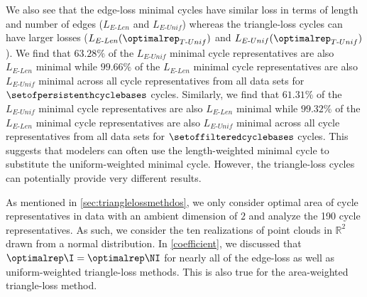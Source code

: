 We also see that the edge-loss minimal cycles have similar loss in terms of length and number of edges ($L_{E\text{-}Len}$ and $L_{E\text{-}Unif}$) whereas the triangle-loss cycles can have larger losses ($L_{E\text{-}Len}(\optimalrep_{T\text{-}Unif})$ and $L_{E\text{-}Unif}(\optimalrep_{T\text{-}Unif})$). We find that $63.28\%$ of the $L_{E\text{-}Unif}$ minimal cycle representatives are also $L_{E\text{-}Len}$ minimal while $99.66\%$ of the $L_{E\text{-}Len}$ minimal cycle representatives are also $L_{E\text{-}Unif}$ minimal across all cycle representatives from all data sets for $\setofpersistenthcyclebases$ cycles. Similarly, we find that $61.31\%$ of the $L_{E\text{-}Unif}$ minimal cycle representatives are also $L_{E\text{-}Len}$ minimal while $99.32\%$ of the $L_{E\text{-}Len}$ minimal cycle representatives are also $L_{E\text{-}Unif}$ minimal across all cycle representatives from all data sets for $\setoffilteredcyclebases$ cycles. This suggests that modelers can often use the length-weighted minimal cycle to substitute the uniform-weighted minimal cycle. However, the triangle-loss cycles can potentially provide very different results. %

As mentioned in \se \ref{sec:trianglelossmethdos}, we only consider optimal area of cycle representatives in data with an ambient dimension of $2$ and analyze the 190 cycle representatives. As such, we consider the ten realizations of point clouds in $\mathbb{R}^2$ drawn from a normal distribution. In \se \ref{coefficient}, we discussed that $\optimalrep\I = \optimalrep\NI$ for nearly all of the edge-loss as well as uniform-weighted triangle-loss methods. This is also true for the area-weighted triangle-loss method.


